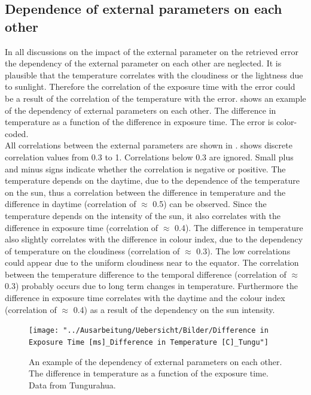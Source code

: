 \documentclass  [
  paper    = a4,
  BCOR     = 10mm,
  twoside,
  fontsize = 12pt,
  fleqn,
  toc      = bibnumbered,
  toc      = listofnumbered,
  numbers  = noendperiod,
  headings = normal,
  listof   = leveldown,
  version  = 3.03
]                                       {scrreprt}
\begin{document}
	\subsection*{Dependence of external parameters on each other}
	In all discussions on the impact of the external parameter on the retrieved   error the  dependency of the external parameter on each other are neglected. It is plausible that the temperature correlates with the cloudiness or the lightness due to sunlight. Therefore the correlation of the exposure time with the   error could be a result of the correlation of the temperature with the   error.  shows an example of the dependency of external parameters on each other. The difference in temperature as a function of the difference in exposure time. The   error is color-coded. \\
	All correlations between the external parameters are shown in .  shows discrete correlation values from 0.3 to 1. Correlations below 0.3 are ignored. Small plus and minus signs indicate whether the correlation is negative or positive. 
	The temperature depends on the daytime, due to the dependence of the temperature on the sun, thus a correlation between the  difference in temperature and the difference in daytime (correlation of $\approx$ 0.5) can be observed. Since the temperature depends on the intensity of the sun, it also correlates with  the difference in exposure time (correlation of $\approx$ 0.4). The difference in temperature also slightly correlates with the difference in colour index, due to the dependency of temperature on the cloudiness (correlation of $\approx$ 0.3). The low correlations could appear due to the uniform cloudiness near to the equator. The correlation between the temperature difference to the temporal difference (correlation of $\approx$ 0.3) probably occurs due to long term changes in temperature. Furthermore the difference in exposure time correlates with the daytime and the colour index (correlation of $\approx$ 0.4) as a result of the dependency on the sun intensity.\\
	\begin{figure}[h]
		\centering
		\texttt{[image: "../Ausarbeitung/Uebersicht/Bilder/Difference in Exposure Time [ms]\_Difference in Temperature [C]\_Tungu"]}
		\caption{An example of the dependency of external parameters on each other. The difference in temperature as a function of the exposure time. Data from Tungurahua.}
		\label{fig:difference-in-exposure-time-msdifference-in-temperature-ctungu}
	\end{figure}
\end{document}
